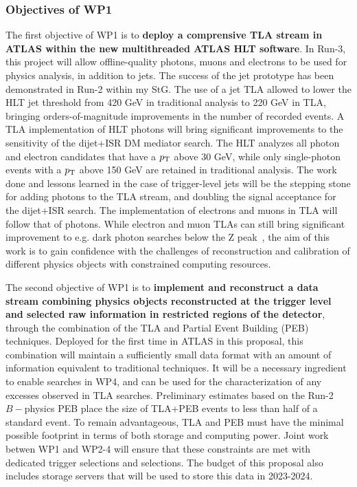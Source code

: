 \subsubsection{Objectives of WP1}

The first objective of WP1 is to \textbf{deploy a comprensive TLA stream in ATLAS within the new multithreaded ATLAS HLT software}. %
In Run-3, this project will allow offline-quality photons, muons and electrons to be used for physics analysis, in addition to jets. 
The success of the jet prototype has been demonstrated in Run-2 within my StG. 
The use of a jet TLA allowed to lower the HLT jet threshold from 420 GeV in traditional analysis to 220 GeV in TLA, bringing orders-of-magnitude improvements in the number of recorded events. 
A TLA implementation of HLT photons will bring significant improvements to the sensitivity of the dijet+ISR DM mediator search. 
The HLT analyzes all photon and electron candidates that have a $p_{\rm{T}}$ above 30 GeV, 
while only single-photon events with a $p_{\rm{T}}$ above 150 GeV are retained in traditional analysis. 
The work done and lessons learned in the case of trigger-level jets will be the stepping stone for adding photons to the TLA stream, 
and doubling the signal acceptance for the dijet+ISR search. 
The implementation of electrons and muons in TLA will follow that of photons.
While electron and muon TLAs can still bring significant improvement to e.g. dark photon searches below the Z peak~\cite{ToBeCited}, %
the aim of this work is to gain confidence with the challenges of reconstruction and calibration of different physics objects with constrained computing resources. 

The second objective of WP1 is to \textbf{implement and reconstruct a data stream combining physics objects reconstructed at the trigger level and selected raw information in restricted regions of the detector}, through the combination of the TLA and Partial Event Building (PEB) techniques. 
Deployed for the first time in ATLAS in this proposal, this combination will maintain a sufficiently small data format with an amount of information equivalent to traditional techniques. 
It will be a necessary ingredient to enable searches in WP4, and can be used for the characterization of any excesses observed in TLA searches. 
Preliminary estimates based on the Run-2 $B-$physics PEB %
place the size of TLA+PEB events to less than half of a standard event. 
To remain advantageous, TLA and PEB must have the minimal possible footprint in terms of both storage and computing power. 
Joint work betwen WP1 and WP2-4 will ensure that these constraints are met with dedicated trigger selections and selections.   
The budget of this proposal also includes storage servers that will be used to store this data in 2023-2024. 

